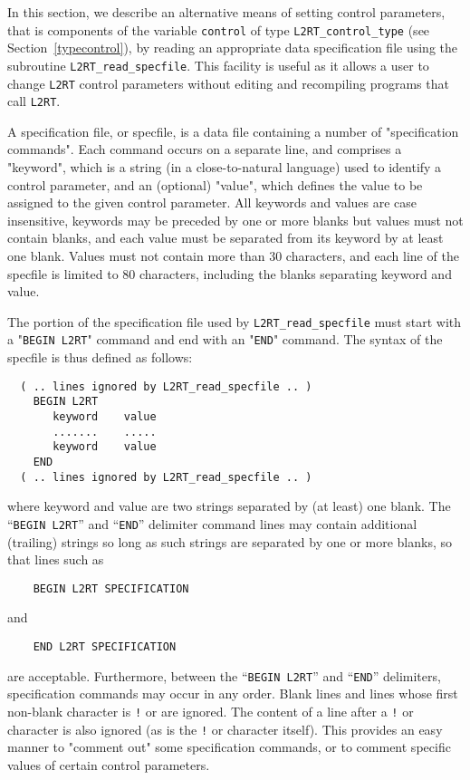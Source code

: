 \documentclass{galahad}
\newcommand{\packagename}{L2\-RT}
\begin{document}

\galfeatures
\noindent In this section, we describe an alternative means of setting 
control parameters, that is components of the variable {\tt control} of type
{\tt \packagename\_control\_type}
(see Section~\ref{typecontrol}), 
by reading an appropriate data specification file using the
subroutine {\tt \packagename\_read\_specfile}. This facility
is useful as it allows a user to change  {\tt \packagename} control parameters 
without editing and recompiling programs that call {\tt \packagename}.

A specification file, or specfile, is a data file containing a number of 
"specification commands". Each command occurs on a separate line, 
and comprises a "keyword", 
which is a string (in a close-to-natural language) used to identify a 
control parameter, and 
an (optional) "value", which defines the value to be assigned to the given
control parameter. All keywords and values are case insensitive, 
keywords may be preceded by one or more blanks but
values must not contain blanks, and
each value must be separated from its keyword by at least one blank.
Values must not contain more than 30 characters, and 
each line of the specfile is limited to 80 characters,
including the blanks separating keyword and value.

The portion of the specification file used by 
{\tt \packagename\_read\_specfile}
must start
with a "{\tt BEGIN \packagename}" command and end with an 
"{\tt END}" command.  The syntax of the specfile is thus defined as follows:
\begin{verbatim}
  ( .. lines ignored by L2RT_read_specfile .. )
    BEGIN L2RT
       keyword    value
       .......    .....
       keyword    value
    END 
  ( .. lines ignored by L2RT_read_specfile .. )
\end{verbatim}
where keyword and value are two strings separated by (at least) one blank.
The ``{\tt BEGIN \packagename}'' and ``{\tt END}'' delimiter command lines 
may contain additional (trailing) strings so long as such strings are 
separated by one or more blanks, so that lines such as
\begin{verbatim}
    BEGIN L2RT SPECIFICATION
\end{verbatim}
and
\begin{verbatim}
    END L2RT SPECIFICATION
\end{verbatim}
are acceptable. Furthermore, 
between the
``{\tt BEGIN \packagename}'' and ``{\tt END}'' delimiters,
specification commands may occur in any order.  Blank lines and
lines whose first non-blank character is {\tt !} or {\tt *} are ignored. 
The content 
of a line after a {\tt !} or {\tt *} character is also 
ignored (as is the {\tt !} or {\tt *}
character itself). This provides an easy manner to "comment out" some 
specification commands, or to comment specific values 
of certain control parameters.  
\end{document}
